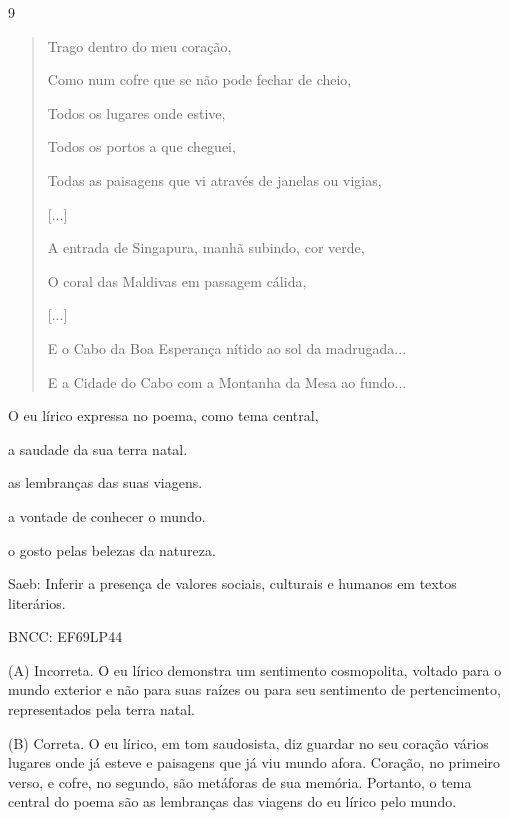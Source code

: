 \num{9}

\begin{quote}
Trago dentro do meu coração,

Como num cofre que se não pode fechar de cheio,

Todos os lugares onde estive,

Todos os portos a que cheguei,

Todas as paisagens que vi através de janelas ou vigias,

{[}...{]}

A entrada de Singapura, manhã subindo, cor verde,

O coral das Maldivas em passagem cálida,

{[}...{]}

E o Cabo da Boa Esperança nítido ao sol da madrugada...

E a Cidade do Cabo com a Montanha da Mesa ao fundo...
\end{quote}

O eu lírico expressa no poema, como tema central,

\begin{escolha}
\item a saudade da sua terra natal.

\item as lembranças das suas viagens.

\item a vontade de conhecer o mundo.

\item o gosto pelas belezas da natureza.
\end{escolha}

Saeb: Inferir a presença de valores sociais, culturais e humanos em
textos literários.

BNCC: EF69LP44

(A) Incorreta. O eu lírico demonstra um sentimento cosmopolita, voltado
para o mundo exterior e não para suas raízes ou para seu sentimento de
pertencimento, representados pela terra natal.

(B) Correta. O eu lírico, em tom saudosista, diz guardar no seu coração
vários lugares onde já esteve e paisagens que já viu mundo afora.
Coração, no primeiro verso, e cofre, no segundo, são metáforas de sua
memória. Portanto, o tema central do poema são as lembranças das viagens
do eu lírico pelo mundo.

